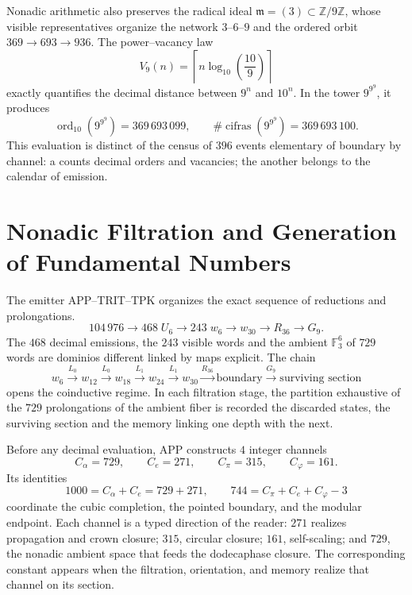 Nonadic arithmetic also preserves the radical ideal
\(\mathfrak m=(3)\subset\mathbb Z/9\mathbb Z\), whose visible
representatives organize the network \(3\)--\(6\)--\(9\) and the ordered orbit
\(369\to693\to936\). The power--vacancy law
\[
 V_9(n)=\left\lceil n\log_{10}\!\left(\frac{10}{9}\right)\right\rceil
\]
exactly quantifies the decimal distance between \(9^n\) and \(10^n\). In
the tower \(9^{9^9}\), it produces
\[
 \operatorname{ord}_{10}\!\left(9^{9^9}\right)=369\,693\,099,
 \qquad
 \#\operatorname{cifras}\!\left(9^{9^9}\right)=369\,693\,100.
\]
This evaluation is distinct of the census of \(396\) events elementary of
boundary by channel: a
counts decimal orders and vacancies; the another belongs to the calendar of
emission.

\section*{Nonadic Filtration and Generation of Fundamental Numbers}

The emitter APP--TRIT--TPK organizes the exact sequence of reductions and prolongations.
\[
 104\,976\longrightarrow468\;U_6\longrightarrow243\;w_6
 \longrightarrow w_{30}\longrightarrow R_{36}\longrightarrow G_9.
\]
The \(468\) decimal emissions, the \(243\) visible words and the ambient
\(\mathbb F_3^6\) of \(729\) words are dominios different linked by
maps explicit. The chain
\[
 w_6\xrightarrow{L_0}w_{12}\xrightarrow{L_0}w_{18}
 \xrightarrow{L_1}w_{24}\xrightarrow{L_1}w_{30}
 \xrightarrow{R_{36}}\text{boundary}
 \xrightarrow{G_9}\text{surviving section}
\]
opens the coinductive regime. In each filtration stage, the partition
exhaustive of the \(729\) prolongations of the ambient fiber is recorded the
discarded states, the surviving section and
the memory linking one depth with the next.

Before any decimal evaluation, APP constructs \(4\) integer channels
\[
 C_\alpha=729,\qquad C_e=271,\qquad
 C_\pi=315,\qquad C_\varphi=161.
\]
Its identities
\[
 1000=C_\alpha+C_e=729+271,
 \qquad
 744=C_\pi+C_e+C_\varphi-3
\]
coordinate the cubic completion, the pointed boundary, and the modular endpoint.
Each channel is a typed direction of the reader: \(271\) realizes propagation and
crown closure; \(315\), circular closure; \(161\), self-scaling; and
\(729\), the nonadic ambient space that feeds the dodecaphase closure. The
corresponding constant appears when the filtration, orientation, and
memory realize that channel on its section.

